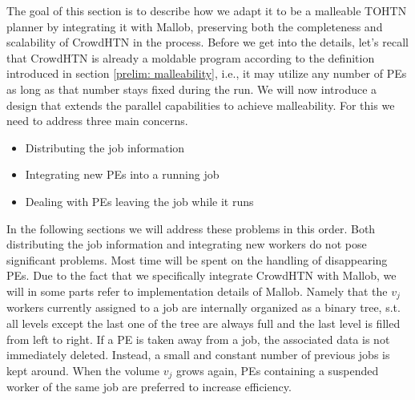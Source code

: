 The goal of this section is to describe how we adapt it to be a malleable TOHTN planner by integrating it with Mallob, preserving both the completeness and scalability of CrowdHTN in the process. Before we get into the details, let's recall that CrowdHTN is already a moldable program according to the definition introduced in section \ref{prelim: malleability}, i.e., it may utilize any number of PEs as long as that number stays fixed during the run. We will now introduce a design that extends the parallel capabilities to achieve malleability. For this we need to address three main concerns.
\begin{itemize}
	\item Distributing the job information
	\item Integrating new PEs into a running job
	\item Dealing with PEs leaving the job while it runs
\end{itemize}
In the following sections we will address these problems in this order. Both distributing the job information and integrating new workers do not pose significant problems. Most time will be spent on the handling of disappearing PEs.
Due to the fact that we specifically integrate CrowdHTN with Mallob, we will in some parts refer to implementation details of Mallob. Namely that the $v_j$ workers currently assigned to a job are internally organized as a binary tree, s.t. all levels except the last one of the tree are always full and the last level is filled from left to right. If a PE is taken away from a job, the associated data is not immediately deleted. Instead, a small and constant number of previous jobs is kept around. When the volume $v_j$ grows again, PEs containing a suspended worker of the same job are preferred to increase efficiency. \\

